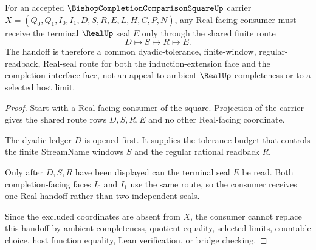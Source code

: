 \begin{theorem}
\label{thm:bishop-completion-comparison-square-real-handoff}
For an accepted $\BishopCompletionComparisonSquareUp$ carrier $X=(Q_0,Q_1,I_0,I_1,D,S,R,E,L,H,C,P,N)$, any Real-facing consumer must receive the terminal $\RealUp$ seal $E$ only through the shared finite route
$$
D \longmapsto S \longmapsto R \longmapsto E .
$$
The handoff is therefore a common dyadic-tolerance, finite-window, regular-readback, Real-seal route for both the induction-extension face and the completion-interface face, not an appeal to ambient $\RealUp$ completeness or to a selected host limit.
\end{theorem}
\begin{proof}
Start with a Real-facing consumer of the square. Projection of the carrier gives the shared route rows $D,S,R,E$ and no other Real-facing coordinate.

The dyadic ledger $D$ is opened first. It supplies the tolerance budget that controls the finite StreamName windows $S$ and the regular rational readback $R$.

Only after $D,S,R$ have been displayed can the terminal seal $E$ be read. Both completion-facing faces $I_0$ and $I_1$ use the same route, so the consumer receives one Real handoff rather than two independent seals.

Since the excluded coordinates are absent from $X$, the consumer cannot replace this handoff by ambient completeness, quotient equality, selected limits, countable choice, host function equality, Lean verification, or bridge checking.
\end{proof}

